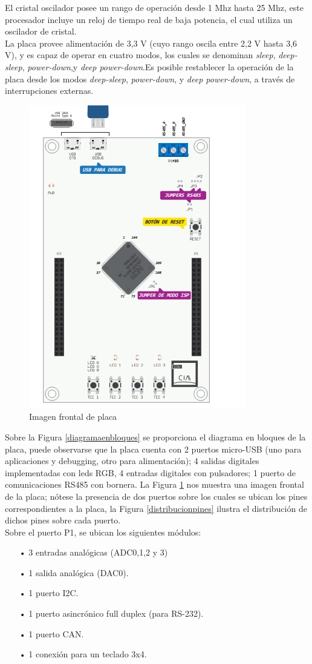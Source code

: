 \documentclass[12pt,letterpaper]{article}
\begin{document}
El cristal oscilador posee un rango de operación desde 1 Mhz hasta 25 Mhz, este procesador incluye un reloj de tiempo real de baja potencia, el cual utiliza un oscilador de cristal.
  \\

La placa provee alimentación de 3,3 V (cuyo rango oscila entre 2,2 V hasta 3,6 V), y es capaz de operar en cuatro modos, los cuales se denominan \textit{sleep}, \textit{deep-sleep}, \textit{power-down},y \textit{deep power-down}.Es posible restablecer la operación de la placa desde los modos \textit{deep-sleep}, \textit{power-down}, y \textit{deep power-down}, a través de interrupciones externas.


\begin{figure}[!h]
\centering
\includegraphics[width=6 cm]{figuras/FIGURA_1.jpg}
\caption{Imagen frontal de placa}
\label{Fig2}
\end{figure}

Sobre la Figura  \ref{diagramaenbloques} se proporciona el diagrama en bloques de la placa\cite{diagramaenbloquesdeplaca}, puede observarse que la placa cuenta con 2 puertos micro-USB (uno para aplicaciones y debugging, otro para alimentación); 4 salidas digitales implementadas con leds RGB, 4 entradas digitales con pulsadores; 1 puerto de comunicaciones RS485 con bornera. La Figura  \ref{Fig2} nos muestra  una imagen frontal de la placa; nótese la presencia de dos puertos sobre los cuales se ubican los pines correspondientes a la placa, la Figura  \ref{distribucionpines} ilustra el distribución de dichos pines sobre cada puerto.
  \\

Sobre el puerto P1, se ubican los siguientes módulos:

\begin{enumerate}
\item[•] 3 entradas analógicas (ADC0,1,2 y 3)
\item[•] 1 salida analógica (DAC0).
\item[•] 1 puerto I2C.
\item[•] 1 puerto asincrónico full duplex (para RS-232).
\item[•] 1 puerto CAN.
\item[•] 1 conexión para un teclado 3x4.
\end{enumerate}
\end{document}
